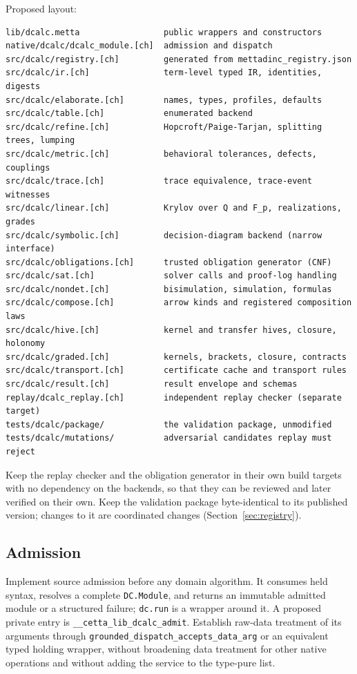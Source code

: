 \documentclass[11pt]{article}
\newcommand{\code}[1]{\texttt{#1}}
\begin{document}
Proposed layout:
\begin{lstlisting}
lib/dcalc.metta                 public wrappers and constructors
native/dcalc/dcalc_module.[ch]  admission and dispatch
src/dcalc/registry.[ch]         generated from mettadinc_registry.json
src/dcalc/ir.[ch]               term-level typed IR, identities, digests
src/dcalc/elaborate.[ch]        names, types, profiles, defaults
src/dcalc/table.[ch]            enumerated backend
src/dcalc/refine.[ch]           Hopcroft/Paige-Tarjan, splitting trees, lumping
src/dcalc/metric.[ch]           behavioral tolerances, defects, couplings
src/dcalc/trace.[ch]            trace equivalence, trace-event witnesses
src/dcalc/linear.[ch]           Krylov over Q and F_p, realizations, grades
src/dcalc/symbolic.[ch]         decision-diagram backend (narrow interface)
src/dcalc/obligations.[ch]      trusted obligation generator (CNF)
src/dcalc/sat.[ch]              solver calls and proof-log handling
src/dcalc/nondet.[ch]           bisimulation, simulation, formulas
src/dcalc/compose.[ch]          arrow kinds and registered composition laws
src/dcalc/hive.[ch]             kernel and transfer hives, closure, holonomy
src/dcalc/graded.[ch]           kernels, brackets, closure, contracts
src/dcalc/transport.[ch]        certificate cache and transport rules
src/dcalc/result.[ch]           result envelope and schemas
replay/dcalc_replay.[ch]        independent replay checker (separate target)
tests/dcalc/package/            the validation package, unmodified
tests/dcalc/mutations/          adversarial candidates replay must reject
\end{lstlisting}
Keep the replay checker and the obligation generator in their own build targets with no dependency
on the backends, so that they can be reviewed and later verified on their own. Keep the validation
package byte-identical to its published version; changes to it are coordinated changes
(Section~\ref{sec:registry}).

\subsection{Admission}

Implement source admission before any domain algorithm. It consumes held syntax, resolves a complete
\code{DC.Module}, and returns an immutable admitted module or a structured failure; \code{dc.run} is a
wrapper around it. A proposed private entry is \code{\_\_cetta\_lib\_dcalc\_admit}. Establish raw-data
treatment of its arguments through \code{grounded\_dispatch\_accepts\_data\_arg} or an equivalent typed
holding wrapper, without broadening data treatment for other native operations and without adding the
service to the type-pure list.
\end{document}
